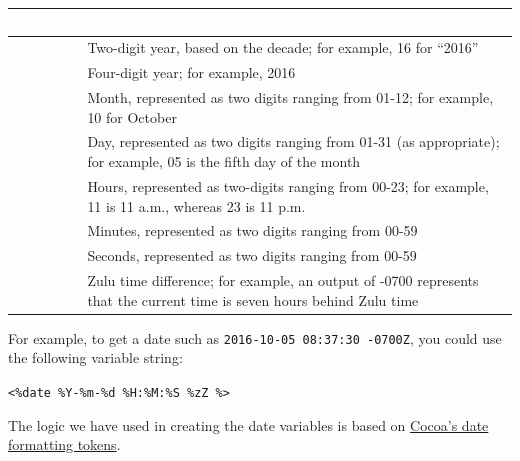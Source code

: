 \documentclass[../main.tex]{subfiles}
\begin{document}
\begin{description}[style=nextline]
\begin{ogsidebar}
      \begingroup
      \small
      \setlength{\LTleft}{0.075\textwidth}
      \setlength{\LTright}{0.075\textwidth}
      \renewcommand{\arraystretch}{1.25}
      \begin{xltabular}{0.85\textwidth}{|l|>{\raggedright\arraybackslash}X|}
        \hline
        \textcolor{white}{\textbf{Variable}} & \textcolor{white}{\textbf{Description}} \\
        \hline
        \endhead
        \hline
        \endfoot
         & Two-digit year, based on the decade; for example, 16 for ``2016'' \\
        \hline
         & Four-digit year; for example, 2016 \\
        \hline
         & Month, represented as two digits ranging from 01-12; for example, 10
        for October \\
        \hline
         & Day, represented as two digits ranging from 01-31 (as appropriate); for
        example, 05 is the fifth day of the month \\
        \hline
         & Hours, represented as two-digits ranging from 00-23; for example, 11 is
        11 a.m., whereas 23 is 11 p.m. \\
        \hline
         & Minutes, represented as two digits ranging from 00-59 \\
        \hline
         & Seconds, represented as two digits ranging from 00-59 \\
        \hline
         & Zulu time difference; for example, an output of -0700 represents that
        the current time is seven hours behind Zulu time \\
        \hline
      \end{xltabular}
      \endgroup

      For example, to get a date such as \texttt{2016-10-05 08:37:30 -0700Z}, you could use the
      following variable string:

      \texttt{<\%date \%Y-\%m-\%d \%H:\%M:\%S \%zZ \%>}

      The logic we have used in creating the date variables is based on
      \href{http://developer.apple.com/library/ios/documentation/cocoa/Conceptual/DataFormatting/Articles/dfDateFormatting10_4.html}{Cocoa's
      date formatting tokens}.
    \end{ogsidebar}


\end{description}
\end{document}
